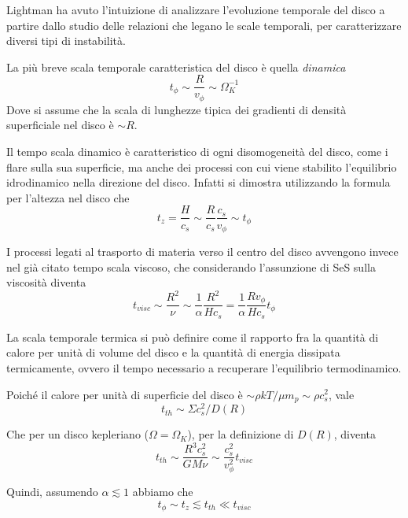 \documentclass[a4paperbi]{article}
\begin{document}
	Lightman ha avuto l'intuizione di analizzare l'evoluzione temporale del disco a partire dallo studio delle relazioni che legano le scale temporali, per caratterizzare diversi tipi di instabilità.	
	
	La più breve scala temporale caratteristica del disco è quella \textit{dinamica}
	\begin{equation}
		t_\phi\sim\frac{R}{v_\phi}\sim\Omega_K^{-1}
	\end{equation}
	Dove si assume che la scala di lunghezze tipica dei gradienti di densità superficiale nel disco è $\sim R$.
	
	Il tempo scala dinamico è caratteristico di ogni disomogeneità del disco, come i flare sulla sua superficie, ma anche dei processi con cui viene stabilito l'equilibrio idrodinamico nella direzione del disco. Infatti si dimostra utilizzando la formula per l'altezza nel disco che
	\begin{equation}
		t_z=\frac{H}{c_s}\sim \frac{R}{c_s}\frac{c_s}{v_\phi}\sim t_\phi
	\end{equation}
	
	I processi legati al trasporto di materia verso il centro del disco avvengono invece nel già citato tempo scala viscoso, che considerando l'assunzione di SeS sulla viscosità diventa
	\begin{equation}
		t_{visc}\sim\frac{R^2}{\nu}\sim\frac{1}{\alpha}\frac{R^2}{Hc_s}=\frac{1}{\alpha}\frac{Rv_\phi}{Hc_s}t_\phi
	\end{equation}

	La scala temporale termica si può definire come il rapporto fra la quantità di calore per unità di volume del disco e la quantità di energia dissipata termicamente, ovvero il tempo necessario a recuperare l'equilibrio termodinamico.
	
	Poiché il calore per unità di superficie del disco è $\sim\rho kT/\mu m_p\sim\rho c_s^2$, vale
	\begin{equation*}
		t_{th}\sim\Sigma c_s^2/D(R)
	\end{equation*}
	
	Che per un disco kepleriano ($\Omega=\Omega_K$), per la definizione di $D(R)$, diventa
	\begin{equation}
		t_{th}\sim\frac{R^3c_s^2}{GM\nu}\sim\frac{c_s^2}{v_\phi^2}t_{visc}
	\end{equation}
	
	Quindi, assumendo $\alpha\lesssim1$ abbiamo che
	\begin{equation}
		t_\phi\sim t_z\lesssim t_{th}\ll t_{visc}	
	\end{equation}
\end{document}
